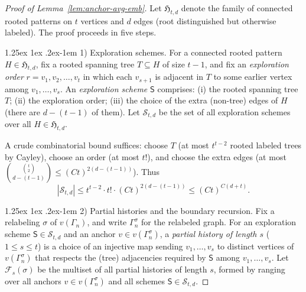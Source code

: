 \documentclass[12pt]{article}
\makeatletter
\renewcommand{\paragraph}{%
  \@startsection{paragraph}{4}%
  {\z@}{1.25ex \@plus 1ex \@minus .2ex}{-1em}%
  {\normalfont\normalsize\bfseries}%
}
\makeatother
\begin{document}
\begin{proof}[Proof of Lemma~\ref{lem:anchor-avg-emb}] Let $\mathfrak H_{t,d}$ denote the family of connected rooted patterns on $t$ vertices and $d$ edges (root distinguished but otherwise labeled). The proof proceeds in five steps.

\paragraph{1) Exploration schemes.}
For a connected rooted pattern $H\in\mathfrak H_{t,d}$, fix a rooted spanning tree $T\subseteq H$ of size $t-1$, and fix an \emph{exploration order} $r=v_1,v_2,\dots,v_t$ in which each $v_{s+1}$ is adjacent in $T$ to some earlier vertex among $v_1,\dots,v_s$.
An \emph{exploration scheme} $\mathsf S$ comprises:
(i) the rooted spanning tree $T$;
(ii) the exploration order;
(iii) the choice of the extra (non-tree) edges of $H$ (there are $d-(t-1)$ of them).
Let $\mathcal S_{t,d}$ be the set of all exploration schemes over all $H\in\mathfrak H_{t,d}$.

A crude combinatorial bound suffices:
choose $T$ (at most $t^{  t-2}$ rooted labeled trees by Cayley),
choose an order (at most $t!$),
and choose the extra edges (at most $\binom{\binom{t}{2}}{d-(t-1)}\le (Ct)^{  2(d-(t-1))}$).
Thus
\begin{equation}\label{eq:scheme-count}
|\mathcal S_{t,d}|
\leq 
t^{  t-2}\cdot t!\cdot (Ct)^{  2(d-(t-1))}
\leq  (Ct)^{  C(d+t)}.
\end{equation}

\paragraph{2) Partial histories and the boundary recursion.}
Fix a relabeling $\sigma$ of $v(\Gamma_n)$, and write $\Gamma_n^\sigma$ for the relabeled graph.
For an exploration scheme $\mathsf S\in\mathcal S_{t,d}$ and an anchor $v\in v(\Gamma_n^\sigma)$, a \emph{partial history of length $s$} ($1\le s\le t$)
is a choice of an injective map sending $v_1,\dots,v_s$ to distinct vertices of $v(\Gamma_n^\sigma)$ that respects the (tree) adjacencies required by $\mathsf S$ among $v_1,\dots,v_s$.
Let $\mathcal F_s(\sigma)$ be the multiset of all partial histories of length $s$, formed by ranging over all anchors $v\in v(\Gamma_n^\sigma)$ and all schemes $\mathsf S\in\mathcal S_{t,d}$.


\end{proof}
\end{document}
